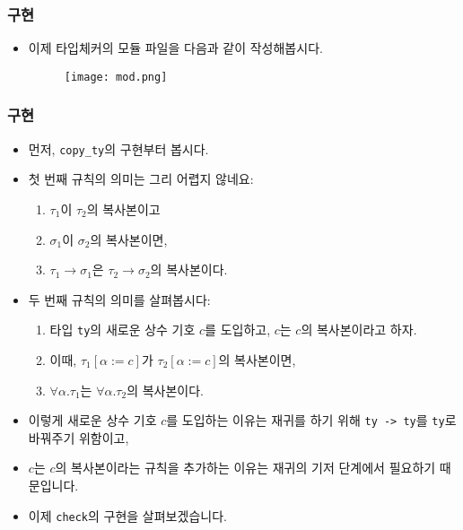 \documentclass[slidestop,compress,mathserif]{beamer}
\begin{document}
    \begin{frame}
        \frametitle{구현}
        \begin{itemize}
            \item 이제 타입체커의 모듈 파일을 다음과 같이 작성해봅시다.
            \begin{figure}[h]
                \begin{center}
                    \texttt{[image: mod.png]}
                \end{center}
            \end{figure}
        \end{itemize}
    \end{frame}

    \begin{frame}
        \frametitle{구현}
        \begin{itemize}
            \item 먼저, \texttt{copy\_ty}의 구현부터 봅시다.
            \pause
            \item 첫 번째 규칙의 의미는 그리 어렵지 않네요:
            \begin{enumerate}
                \item $\tau_1$이 $\tau_2$의 복사본이고
                \item $\sigma_1$이 $\sigma_2$의 복사본이면,
                \item $\tau_1 \to \sigma_1$은 $\tau_2 \to \sigma_2$의 복사본이다.
            \end{enumerate}
            \pause
            \item 두 번째 규칙의 의미를 살펴봅시다:
            \begin{enumerate}
                \item 타입 \texttt{ty}의 새로운 상수 기호 $c$를 도입하고, $c$는 $c$의 복사본이라고 하자.
                \item 이때, $\tau_1 \left[ \alpha := c \right]$가 $\tau_2 \left[ \alpha := c \right]$의 복사본이면,
                \item $\forall \alpha . \tau_1$는 $\forall \alpha . \tau_2$의 복사본이다.
            \end{enumerate}
            \item 이렇게 새로운 상수 기호 $c$를 도입하는 이유는 재귀를 하기 위해 \texttt{ty -> ty}를 \texttt{ty}로 바꿔주기 위함이고,
            \item $c$는 $c$의 복사본이라는 규칙을 추가하는 이유는 재귀의 기저 단계에서 필요하기 때문입니다.
            \pause
            \item 이제 \texttt{check}의 구현을 살펴보겠습니다.
        \end{itemize}
    \end{frame}
\end{document}
